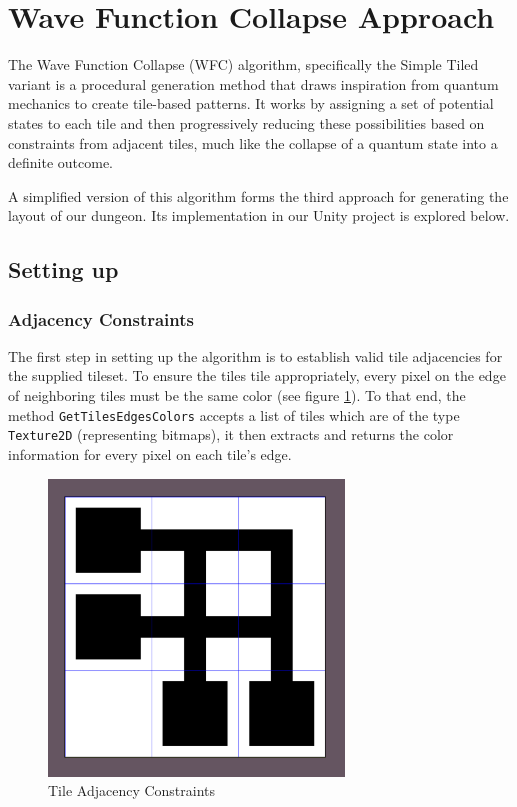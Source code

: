\documentclass[a4paper, 12pt, one column, aas_macros]{article}
\begin{document}
\section{Wave Function Collapse Approach}
The Wave Function Collapse (WFC) algorithm, specifically the Simple Tiled variant is a procedural generation method that draws inspiration from quantum mechanics to create tile-based patterns. It works by assigning a set of potential states to each tile and then progressively reducing these possibilities based on constraints from adjacent tiles, much like the collapse of a quantum state into a definite outcome. 

A simplified version of this algorithm forms the third approach for generating the layout of our dungeon. Its implementation in our Unity project is explored below.

\subsection{Setting up}
\subsubsection{Adjacency Constraints}
The first step in setting up the algorithm is to establish valid tile adjacencies for the supplied tileset. To ensure the tiles tile appropriately, every pixel on the edge of neighboring tiles must be the same color (see figure \ref{fig:wfc-tile-adjacency-constraints}). To that end, the method \texttt{GetTilesEdgesColors} accepts a list of tiles which are of the type \texttt{Texture2D} (representing bitmaps), it then extracts and returns the color information for every pixel on each tile's edge.

\begin{figure}[htbp]
  \centering
  \includegraphics[width=0.7\textwidth]{images/wfc-tile-adjacency-constraints.png}
  \caption{Tile Adjacency Constraints}
  \label{fig:wfc-tile-adjacency-constraints}
\end{figure}
\end{document}

